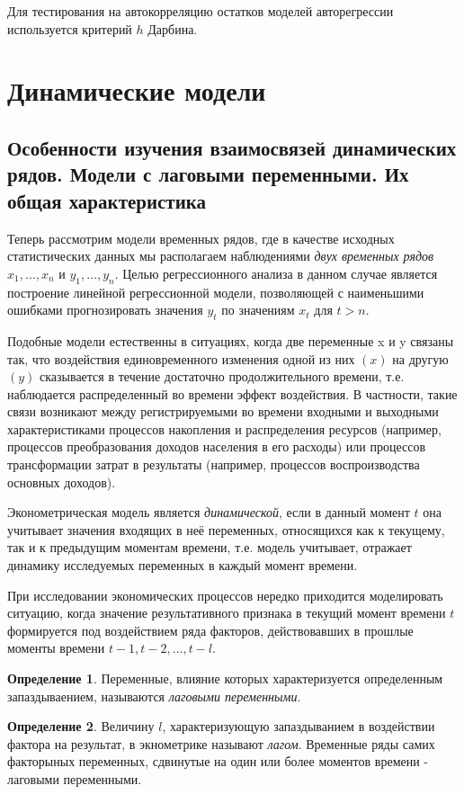 \documentclass[aps,%
12pt,%
final,%
oneside,
onecolumn,%
musixtex, %
superscriptaddress,%
centertags]{article} %
\theoremstyle{plain}
\theoremstyle{definition}
\newtheorem{definition}{Определение}[subsection]
\theoremstyle{remark}
\begin{document}
Для тестирования на автокорреляцию остатков моделей авторегрессии используется критерий $h$ Дарбина.

\newpage
\section{Динамические модели}

\subsection{Особенности изучения взаимосвязей динамических рядов. Модели с лаговыми переменными. Их общая характеристика}

Теперь рассмотрим модели временных рядов, где в качестве исходных статистических данных мы располагаем наблюдениями \textit{двух временных рядов} $x_1,\ldots,x_n$ и $y_1,\ldots,y_n$. Целью регрессионного анализа в данном случае является построение линейной регрессионной модели, позволяющей с наименьшими ошибками прогнозировать значения $y_t$ по значениям $x_t$ для $t >n$.

Подобные модели естественны в ситуациях, когда две переменные x и y связаны так, что воздействия единовременного изменения одной из них $(x)$ на другую $(y)$ сказывается в течение достаточно продолжительного времени, т.е. наблюдается распределенный во времени эффект воздействия. В частности, такие связи возникают между регистрируемыми во времени входными и выходными характеристиками процессов накопления и распределения ресурсов (например, процессов преобразования доходов населения в его расходы) или процессов трансформации затрат в результаты (например, процессов
воспроизводства основных доходов).

Эконометрическая модель является \textit{динамической}, если в данный момент $t$ она учитывает значения входящих в неё переменных, относящихся как к текущему, так и к предыдущим моментам времени, т.е. модель учитывает, отражает динамику исследуемых переменных в каждый момент времени.

При исследовании экономических процессов нередко приходится моделировать ситуацию, когда значение результативного признака в текущий момент времени $t$ формируется под воздействием ряда факторов, действовавших в прошлые моменты времени $t-1,t-2,\ldots,t-l$.

\begin{definition}
	Переменные, влияние которых характеризуется определенным запаздываением, называются \textit{лаговыми переменными}.
\end{definition}
\begin{definition}
	Величину $l$, характеризующую запаздыванием в воздействии фактора на результат, в экнометрике называют \textit{лагом}. Временные ряды самих факторыных переменных, сдвинутые на один или более моментов времени - лаговыми переменными.
\end{definition}
\end{document}
